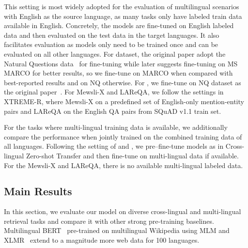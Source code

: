 

This setting is most widely adopted for the evaluation of multilingual scenarios with English as the source language, as many tasks only have labeled train data available in English. Concretely, the models are fine-tuned on English labeled data and then evaluated on the test data in the target languages. It also facilitates evaluation as models only need to be trained once and can be evaluated on all other languages. 
For \tydi dataset, the original paper adopt the Natural Questions data~\citep{kwiatkowski-etal-2019-natural} for fine-tuning while later \citet{zhang2022towards} suggests fine-tuning on MS MARCO for better results, so we fine-tune on MARCO when compared with best-reported results and on NQ otherwise. For \xor, we fine-tune on NQ dataset as the original paper~\citep{asai-etal-2021-xor}. For Mewsli-X and LAReQA, we follow the settings in XTREME-R, where Mewsli-X on a predefined set of English-only mention-entity pairs and LAReQA on the English QA pairs from SQuAD v1.1 train set.


For the tasks where multi-lingual training data is available, we additionally compare the performance when jointly trained on the combined training data of all languages. Following the setting of \tydi and \xor, we pre–fine-tune models as in Cross-lingual Zero-shot Transfer and then fine-tune on multi-lingual data if available. For the Mewsli-X and LAReQA, there is no available multi-lingual labeled data.



\subsection{Main Results}


In this section, we evaluate our model on diverse cross-lingual and multi-lingual retrieval tasks and compare it with other strong pre-training baselines. 
Multilingual BERT~\citep{bert2019} pre-trained on multilingual Wikipedia using MLM and XLMR~\citep{conneau2019unsupervised} extend to a magnitude more web data for 100 languages. 

